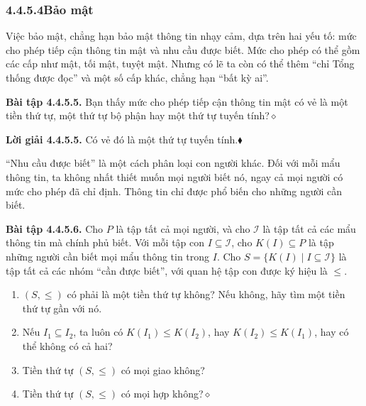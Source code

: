 \subsubsection*{4.4.5.4\quad Bảo mật}

Việc bảo mật, chẳng hạn bảo mật thông tin nhạy cảm, dựa trên hai yếu tố: mức cho phép tiếp cận thông tin mật và nhu cầu được biết. Mức cho phép có thể gồm các cấp như mật, tối mật, tuyệt mật. Nhưng có lẽ ta còn có thể thêm ``chỉ Tổng thống được đọc'' và một số cấp khác, chẳng hạn ``bất kỳ ai''.

\noindent\textbf{Bài tập 4.4.5.5.}\keepwithnext
Bạn thấy mức cho phép tiếp cận thông tin mật có vẻ là một tiền thứ tự, một thứ tự bộ phận hay một thứ tự tuyến tính?\nobreak\hfill$\diamond$

\noindent\textbf{Lời giải 4.4.5.5.}\keepwithnext
Có vẻ đó là một thứ tự tuyến tính.\nobreak\hfill$\blacklozenge$

``Nhu cầu được biết'' là một cách phân loại con người khác. Đối với mỗi mẩu thông tin, ta không nhất thiết muốn mọi người biết nó, ngay cả mọi người có mức cho phép đã chỉ định. Thông tin chỉ được phổ biến cho những người cần biết.

\noindent\textbf{Bài tập 4.4.5.6.}\keepwithnext
Cho $P$ là tập tất cả mọi người, và cho $\mathcal I$ là tập tất cả các mẩu thông tin mà chính phủ biết. Với mỗi tập con $I\subseteq\mathcal I$, cho $K(I)\subseteq P$ là tập những người cần biết mọi mẩu thông tin trong $I$. Cho $S=\{K(I)\mid I\subseteq\mathcal I\}$ là tập tất cả các nhóm ``cần được biết'', với quan hệ tập con được ký hiệu là $\le$.
\begin{enumerate}[label=\alph*.]
\item $(S,\le)$ có phải là một tiền thứ tự không? Nếu không, hãy tìm một tiền thứ tự gần với nó.
\item Nếu $I_1\subseteq I_2$, ta luôn có $K(I_1)\le K(I_2)$, hay $K(I_2)\le K(I_1)$, hay có thể không có cả hai?
\item Tiền thứ tự $(S,\le)$ có mọi giao không?
\item Tiền thứ tự $(S,\le)$ có mọi hợp không?\nobreak\hfill$\diamond$
\end{enumerate}

